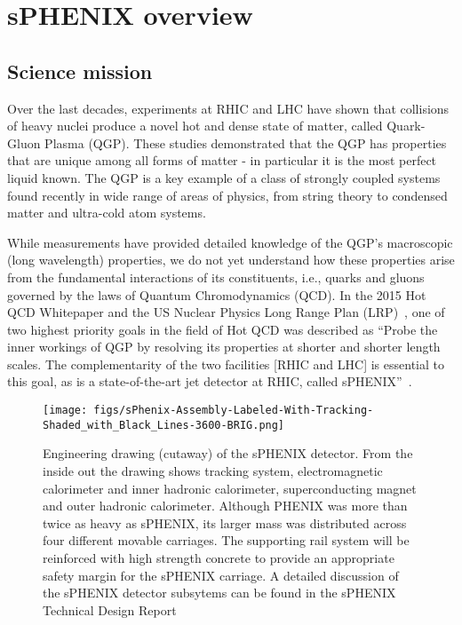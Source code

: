 \chapter{sPHENIX overview}
\label{chap:introduction}
\section{Science mission}
Over the last decades, experiments at RHIC and LHC have shown that collisions of heavy nuclei produce a novel hot and dense state of matter, called Quark-Gluon Plasma (QGP). These studies demonstrated that the QGP has properties that are unique among all forms of matter - in particular it is the most perfect liquid known. The QGP is a key example of a class of strongly coupled systems found recently in wide range of areas of physics, from string theory to condensed matter and ultra-cold atom systems.

While measurements have provided detailed knowledge of the QGP's macroscopic (long wavelength) properties, we do not yet understand how these properties arise from the fundamental interactions of its constituents, i.e., quarks and gluons governed by the laws of Quantum Chromodynamics (QCD).  In the 2015 Hot QCD Whitepaper and the US Nuclear Physics Long Range Plan (LRP)~\cite{Geesaman:2015fha}, one of two highest  priority goals in the field of Hot QCD was described as ``Probe the inner workings of QGP by resolving its properties at shorter and shorter length scales.
The complementarity of the two facilities [RHIC and LHC] is essential to this goal, as is a state-of-the-art jet detector at RHIC, called sPHENIX''~\cite{Geesaman:2015fha}.

\begin{figure}[htpb]
\begin{center}
\texttt{[image: figs/sPhenix-Assembly-Labeled-With-Tracking-Shaded\_with\_Black\_Lines-3600-BRIG.png]}
\end{center}
\vspace{-0.5cm}
\caption{\label{fig:sPHENIX} Engineering drawing (cutaway) of the
  sPHENIX detector. From the inside out the drawing shows tracking
  system, electromagnetic calorimeter and inner hadronic calorimeter,
  superconducting magnet and outer hadronic calorimeter.  Although
  PHENIX was more than twice as heavy as sPHENIX, its larger mass was
  distributed across four different movable carriages.  The supporting
  rail system will be reinforced with high strength concrete to
  provide an appropriate safety margin for the sPHENIX carriage. A
  detailed discussion of the sPHENIX detector subsytems can be found
  in the sPHENIX Technical Design Report~\cite{sPHENIX:TDR}}
\end{figure}

